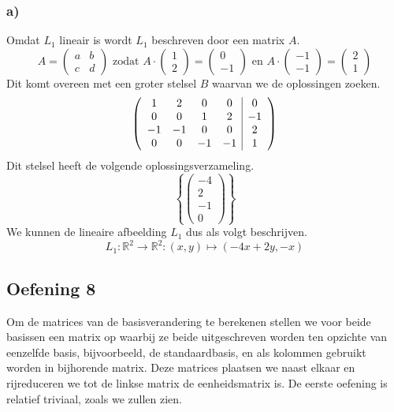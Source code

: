 \documentclass[lineaire_algebra_oplossingen.tex]{subfiles}
\begin{document}
\subsubsection*{a)}
Omdat $L_1$ lineair is wordt $L_1$ beschreven door een matrix $A$.
\[
A = 
\begin{pmatrix}
a & b \\
c & d
\end{pmatrix}
\text{ zodat }
A
\cdot
\begin{pmatrix}1\\2\end{pmatrix}
=\begin{pmatrix}0\\-1\end{pmatrix}
\text{ en }
A
\cdot
\begin{pmatrix}-1\\-1\end{pmatrix}
=\begin{pmatrix}2\\1\end{pmatrix}
\]
Dit komt overeen met een groter stelsel $B$ waarvan we de oplossingen zoeken.
\[
\left(
\begin{array}{c c c c | c}
1 & 2 & 0 & 0 & 0\\
0 & 0 & 1 & 2 & -1\\
-1 & -1 & 0 & 0 & 2\\
0 & 0 & -1 & -1 & 1\\
\end{array}
\right)
\]
Dit stelsel heeft de volgende oplossingsverzameling.
\[
\left\lbrace
\begin{pmatrix}
-4\\2\\-1\\0
\end{pmatrix}
\right\rbrace
\]
We kunnen de lineaire afbeelding $L_1$ dus als volgt beschrijven.
\[
L_1:\mathbb{R}^2\rightarrow\mathbb{R}^2: (x,y)\mapsto (-4x+2y,-x)
\]

\subsection{Oefening 8}
Om de matrices van de basisverandering te berekenen stellen we voor beide basissen een matrix op waarbij ze beide uitgeschreven worden ten opzichte van eenzelfde basis, bijvoorbeeld, de standaardbasis, en als kolommen gebruikt worden in bijhorende matrix. Deze matrices plaatsen we naast elkaar en rijreduceren we tot de linkse matrix de eenheidsmatrix is. De eerste oefening is relatief triviaal, zoals we zullen zien.
\end{document}
